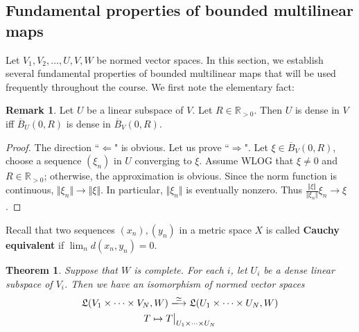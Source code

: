 \documentclass[12pt,b5paper,notitlepage]{article}
\theoremstyle{definition}
\newtheorem{rem}[df]{Remark}
\theoremstyle{plain}
\newtheorem{thm}[df]{Theorem}
\newcommand{\fk}{\mathfrak}
\newcommand{\ovl}{\overline}
\newcommand{\Rbb}{\mathbb R}
\numberwithin{equation}{section}
\begin{document}
\subsection{Fundamental properties of bounded multilinear maps}

Let $V_1,V_2,\dots,U,V,W$ be normed vector spaces. In this section, we establish several fundamental properties of bounded multilinear maps that will be used frequently throughout the course. We first note the elementary fact:

\begin{rem}\label{lb29}
Let $U$ be a linear subspace of $V$. Let $R\in\Rbb_{>0}$. Then $U$ is dense in $V$ iff $\ovl B_U(0,R)$ is dense in $\ovl B_V(0,R)$. 
\end{rem}

\begin{proof}
The direction ``$\Leftarrow$" is obvious. Let us prove ``$\Rightarrow$". Let $\xi\in\ovl B_V(0,R)$, choose a sequence $(\xi_n)$ in $U$ converging to $\xi$. Assume WLOG that $\xi\neq0$ and $R\in\Rbb_{>0}$; otherwise, the approximation is obvious. Since the norm function is continuous, $\Vert\xi_n\Vert\rightarrow\Vert\xi\Vert$. In particular, $\Vert\xi_n\Vert$ is eventually nonzero. Thus $\frac{\Vert\xi\Vert}{\Vert\xi_n\Vert}\xi_n\rightarrow \xi$.
\end{proof}

Recall that two sequences $(x_n),(y_n)$ in a metric space $X$ is called \textbf{Cauchy equivalent}  if $\lim_n d(x_n,y_n)=0$.


\begin{thm}\label{lb31}
Suppose that $W$ is complete. For each $i$, let $U_i$ be a dense linear subspace of $V_i$. Then we have an isomorphism of normed vector spaces
\begin{gather}\label{eq23}
\begin{gathered}
\fk L(V_1\times\cdots\times V_N,W)\xlongrightarrow{\simeq} \fk L(U_1\times\cdots\times U_N,W)\\
T\mapsto T\big|_{U_1\times\cdots\times U_N}
\end{gathered}
\end{gather}
\end{thm}
\end{document}
